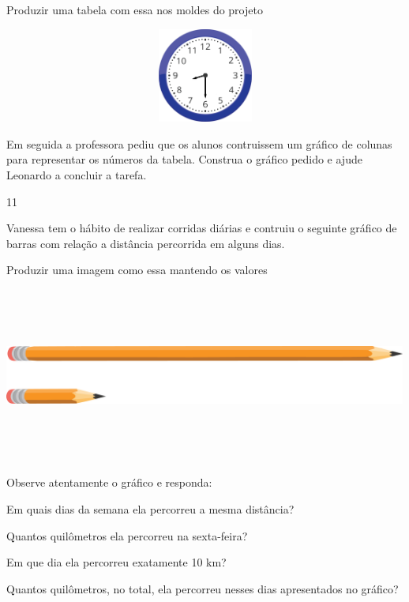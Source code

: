\begin{escolha}
Produzir uma tabela com essa nos moldes do projeto

\includegraphics[width=5.39213in,height=1.22511in]{media/image100.png}

Em seguida a professora pediu que os alunos contruissem um gráfico de
colunas para representar os números da tabela. Construa o gráfico pedido
e ajude Leonardo a concluir a tarefa.


\num{11}

Vanessa tem o hábito de realizar corridas diárias e contruiu o seguinte
gráfico de barras com relação a distância percorrida em alguns dias.

Produzir uma imagem como essa mantendo os valores

\includegraphics[width=5.22545in,height=2.25853in]{media/image101.png}

Observe atentamente o gráfico e responda:

\begin{escolha}
\item
  Em quais dias da semana ela percorreu a mesma distância?

\item
  Quantos quilômetros ela percorreu na sexta-feira?

\item
  Em que dia ela percorreu exatamente 10 km?

\item
  Quantos quilômetros, no total, ela percorreu nesses dias apresentados
  no gráfico?
\end{escolha}


\end{escolha}
